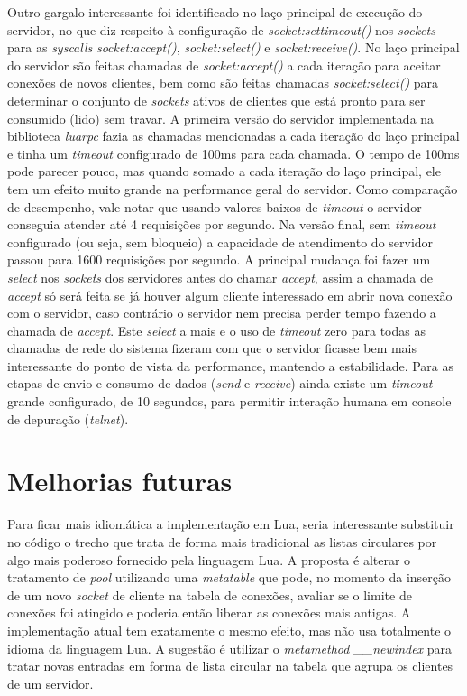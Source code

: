 \documentclass[11pt]{article}
\begin{document}
Outro gargalo interessante foi identificado no laço principal de execução do
servidor, no que diz respeito à configuração de \textit{socket:settimeout()} nos
\textit{sockets} para as \textit{syscalls} \textit{socket:accept()},
\textit{socket:select()} e \textit{socket:receive()}. No laço principal do
servidor são feitas chamadas de \textit{socket:accept()} a cada iteração para
aceitar conexões de novos clientes, bem como são feitas chamadas
\textit{socket:select()} para determinar o conjunto de \textit{sockets} ativos
de clientes que está pronto para ser consumido (lido) sem travar. A primeira
versão do servidor implementada na biblioteca \textit{luarpc} fazia as chamadas
mencionadas a cada iteração do laço principal e tinha um \textit{timeout}
configurado de 100ms para cada chamada. O tempo de 100ms pode parecer pouco, mas
quando somado a cada iteração do laço principal, ele tem um efeito muito grande
na performance geral do servidor. Como comparação de desempenho, vale notar que
usando valores baixos de \textit{timeout} o servidor conseguia atender até 4
requisições por segundo. Na versão final, sem \textit{timeout} configurado (ou
seja, sem bloqueio) a capacidade de atendimento do servidor passou para 1600
requisições por segundo. A principal mudança foi fazer um \textit{select} nos
\textit{sockets} dos servidores antes do chamar \textit{accept}, assim a chamada
de \textit{accept} só será feita se já houver algum cliente interessado em abrir
nova conexão com o servidor, caso contrário o servidor nem precisa perder tempo
fazendo a chamada de \textit{accept}. Este \textit{select} a mais e o uso de
\textit{timeout} zero para todas as chamadas de rede do sistema fizeram com que
o servidor ficasse bem mais interessante do ponto de vista da performance,
mantendo a estabilidade. Para as etapas de envio e consumo de dados
(\textit{send} e \textit{receive}) ainda existe um \textit{timeout} grande
configurado, de 10 segundos, para permitir interação humana em console de
depuração (\textit{telnet}).

\section{Melhorias futuras}\label{sec:future}

Para ficar mais idiomática a implementação em Lua, seria interessante substituir
no código o trecho que trata de forma mais tradicional as listas circulares por
algo mais poderoso fornecido pela linguagem Lua. A proposta é alterar o
tratamento de \textit{pool} utilizando uma \textit{metatable} \cite{metat} que
pode, no momento da inserção de um novo \textit{socket} de cliente na tabela de
conexões, avaliar se o limite de conexões foi atingido e poderia então liberar
as conexões mais antigas. A implementação atual tem exatamente o mesmo efeito,
mas não usa totalmente o idioma da linguagem Lua. A sugestão é utilizar o
\textit{metamethod \_\_newindex} para tratar novas entradas em forma de lista
circular na tabela que agrupa os clientes de um servidor.
\end{document}
